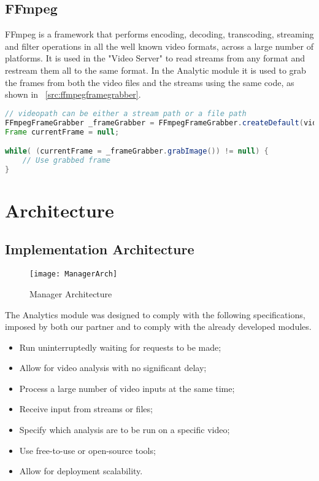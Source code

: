 \subsection{FFmpeg}
FFmpeg is a framework that performs encoding, decoding, transcoding, streaming and filter operations in all the well known video formats, across a large number of platforms. It is used in the "Video Server" to read streams from any format and restream them all to the same format. In the Analytic module it is used to grab the frames from both the video files and the streams using the same code, as shown in ~\ref{src:ffmpegframegrabber}.

\begin{lstlisting}[float,language=Java, label={src:ffmpegframegrabber}, caption=FFmpegFrameGrabber usage example] 
// videopath can be either a stream path or a file path
FFmpegFrameGrabber _frameGrabber = FFmpegFrameGrabber.createDefault(videopath);
Frame currentFrame = null;

while( (currentFrame = _frameGrabber.grabImage()) != null) {
	// Use grabbed frame
}
\end{lstlisting}

\section{Architecture}

\subsection{Implementation Architecture}

\begin{figure}[h]
  \begin{center}
    \leavevmode
    \texttt{[image: ManagerArch]}
    \caption{Manager Architecture}
    \label{fig:manager_arch}
  \end{center}
\end{figure}


The Analytics module was designed to comply with the following specifications, imposed by both our partner and to comply with the already developed modules. 

\begin{itemize}
	\item Run uninterruptedly waiting for requests to be made;
	\item Allow for video analysis with no significant delay;
	\item Process a large number of video inputs at the same time;
	\item Receive input from streams or files;
	\item Specify which analysis are to be run on a specific video;
	\item Use free-to-use or open-source tools;
	\item Allow for deployment scalability.
\end{itemize}


